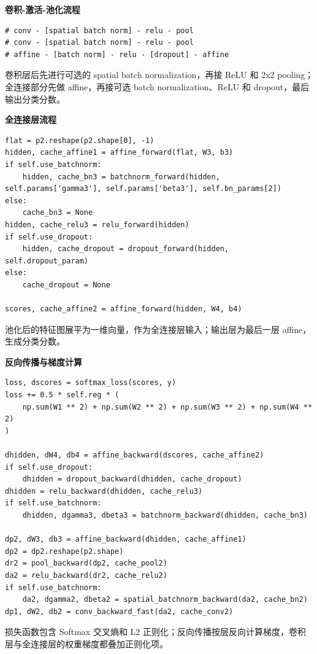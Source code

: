 \textbf{卷积-激活-池化流程}

\begin{lstlisting}[style=cleanpython]
# conv - [spatial batch norm] - relu - pool
# conv - [spatial batch norm] - relu - pool
# affine - [batch norm] - relu - [dropout] - affine
\end{lstlisting}

卷积层后先进行可选的 spatial batch normalization，再接 ReLU 和 2x2 pooling；全连接部分先做 affine，再接可选 batch normalization、ReLU 和 dropout，最后输出分类分数。

\textbf{全连接层流程}

\begin{lstlisting}[style=cleanpython]
flat = p2.reshape(p2.shape[0], -1)
hidden, cache_affine1 = affine_forward(flat, W3, b3)
if self.use_batchnorm:
    hidden, cache_bn3 = batchnorm_forward(hidden, self.params['gamma3'], self.params['beta3'], self.bn_params[2])
else:
    cache_bn3 = None
hidden, cache_relu3 = relu_forward(hidden)
if self.use_dropout:
    hidden, cache_dropout = dropout_forward(hidden, self.dropout_param)
else:
    cache_dropout = None

scores, cache_affine2 = affine_forward(hidden, W4, b4)
\end{lstlisting}

池化后的特征图展平为一维向量，作为全连接层输入；输出层为最后一层 affine，生成分类分数。

\textbf{反向传播与梯度计算}

\begin{lstlisting}[style=cleanpython]
loss, dscores = softmax_loss(scores, y)
loss += 0.5 * self.reg * (
    np.sum(W1 ** 2) + np.sum(W2 ** 2) + np.sum(W3 ** 2) + np.sum(W4 ** 2)
)

dhidden, dW4, db4 = affine_backward(dscores, cache_affine2)
if self.use_dropout:
    dhidden = dropout_backward(dhidden, cache_dropout)
dhidden = relu_backward(dhidden, cache_relu3)
if self.use_batchnorm:
    dhidden, dgamma3, dbeta3 = batchnorm_backward(dhidden, cache_bn3)

dp2, dW3, db3 = affine_backward(dhidden, cache_affine1)
dp2 = dp2.reshape(p2.shape)
dr2 = pool_backward(dp2, cache_pool2)
da2 = relu_backward(dr2, cache_relu2)
if self.use_batchnorm:
    da2, dgamma2, dbeta2 = spatial_batchnorm_backward(da2, cache_bn2)
dp1, dW2, db2 = conv_backward_fast(da2, cache_conv2)
\end{lstlisting}

损失函数包含 Softmax 交叉熵和 L2 正则化；反向传播按层反向计算梯度，卷积层与全连接层的权重梯度都叠加正则化项。

